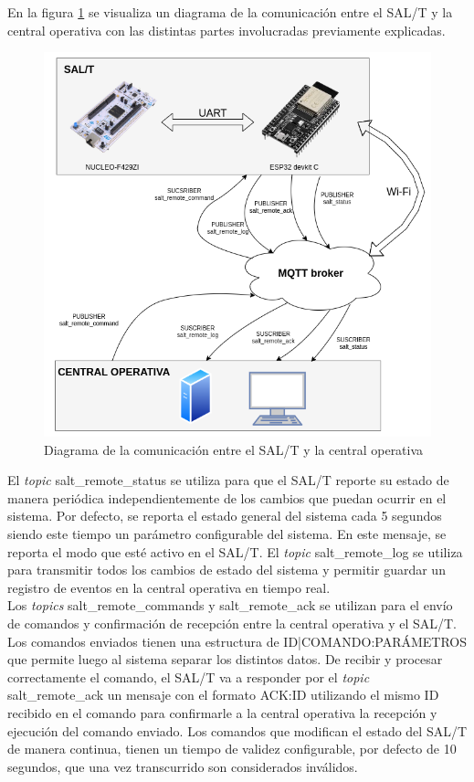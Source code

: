 En la figura \ref{fig:mqtt_bloque} se visualiza un diagrama de la comunicación entre el SAL/T y la central operativa con las distintas partes involucradas previamente explicadas. 

\begin{figure}[H]
    \centering
    \includegraphics[width = \linewidth]{img/mqtt_bloques.png}    
    \caption{Diagrama de la comunicación entre el SAL/T y la central operativa}
    \label{fig:mqtt_bloque}
\end{figure}    




El \textit{topic} salt\_remote\_status se utiliza para que el SAL/T reporte su estado de manera periódica independientemente de los cambios que puedan ocurrir en el sistema. Por defecto, se reporta el estado general del sistema cada 5 segundos siendo este tiempo un parámetro configurable del sistema. En este mensaje, se reporta el modo que esté activo en el SAL/T. El \textit{topic} salt\_remote\_log se utiliza para transmitir todos los cambios de estado del sistema y permitir guardar un registro de eventos en la central operativa en tiempo real. \\


Los \textit{topics} salt\_remote\_commands y salt\_remote\_ack se utilizan para el envío de comandos y confirmación de recepción entre la central operativa y el SAL/T. Los comandos enviados tienen una estructura de ID|COMANDO:PARÁMETROS que permite luego al sistema separar los distintos datos. De recibir y procesar correctamente el comando, el SAL/T va a responder por el \textit{topic} salt\_remote\_ack un mensaje con el formato ACK:ID utilizando el mismo ID recibido en el comando para confirmarle a la central operativa la recepción y ejecución del comando enviado. Los comandos que modifican el estado del SAL/T de manera continua, tienen un tiempo de validez configurable, por defecto de 10 segundos, que una vez transcurrido son considerados inválidos. \\ 




